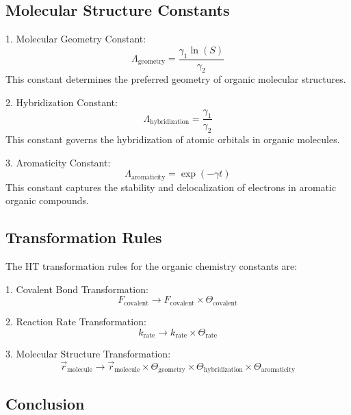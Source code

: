 \documentclass{article}
\theoremstyle{plain}
\theoremstyle{definition}
\theoremstyle{remark}
\begin{document}
\subsection{Molecular Structure Constants}

1. Molecular Geometry Constant:
   \begin{equation}
   \Lambda_\text{geometry} = \frac{\gamma_1\ln(S)}{\gamma_2}
   \end{equation}
   This constant determines the preferred geometry of organic molecular structures.

2. Hybridization Constant:
   \begin{equation}
   \Lambda_\text{hybridization} = \frac{\gamma_1}{\gamma_2}
   \end{equation}
   This constant governs the hybridization of atomic orbitals in organic molecules.

3. Aromaticity Constant:
   \begin{equation}
   \Lambda_\text{aromaticity} = \exp(-\gamma t)
   \end{equation}
   This constant captures the stability and delocalization of electrons in aromatic organic compounds.

\subsection{Transformation Rules}

The HT transformation rules for the organic chemistry constants are:

1. Covalent Bond Transformation:
   \begin{equation}
   F_\text{covalent} \rightarrow F_\text{covalent} \times \Theta_\text{covalent}
   \end{equation}

2. Reaction Rate Transformation:
   \begin{equation}
   k_\text{rate} \rightarrow k_\text{rate} \times \Theta_\text{rate}
   \end{equation}

3. Molecular Structure Transformation:
   \begin{equation}
   \vec{r}_\text{molecule} \rightarrow \vec{r}_\text{molecule} \times \Theta_\text{geometry} \times \Theta_\text{hybridization} \times \Theta_\text{aromaticity}
   \end{equation}

\subsection{Conclusion}
\end{document}
